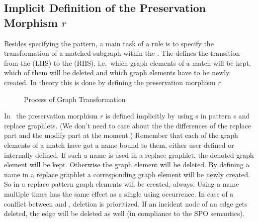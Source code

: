 \subsection{Implicit Definition of the Preservation Morphism $r$}
\label{rule:morphismr}
Besides specifying the pattern, a main task of a rule is to specify the transformation of a matched subgraph within the . 
The  defines the transition from the  (LHS) to the  (RHS), i.e.\ which graph elements of a match will be kept, which of them will be deleted and which graph elements have to be newly created.
In theory this is done by defining the preservation morphism $r$.
\begin{figure}[htbp]
	\centering
  \caption{Process of Graph Transformation}
  \label{rule:figrule}
\end{figure}
In \GrG\ the preservation morphism $r$ is defined implicitly by using s in pattern s and replace graphlets. (We don't need to care about the the differences of the replace part and the modify part at the moment.)
Remember that each of the graph elements of a match have got a name bound to them, either user defined or internally defined. If such a name is used in a replace graphlet, the denoted graph element will be kept. 
Otherwise the graph element will be deleted.
By defining a name in a replace graphlet a corresponding graph element will be newly created.
So in a replace pattern  graph elements will be created, always.
Using a name multiple times has the same effect as a single using occurrence.
In case of a conflict between  and , deletion is prioritized. 
If an incident node of an edge gets deleted, the edge will be deleted as well (in compliance to the SPO semantics).

